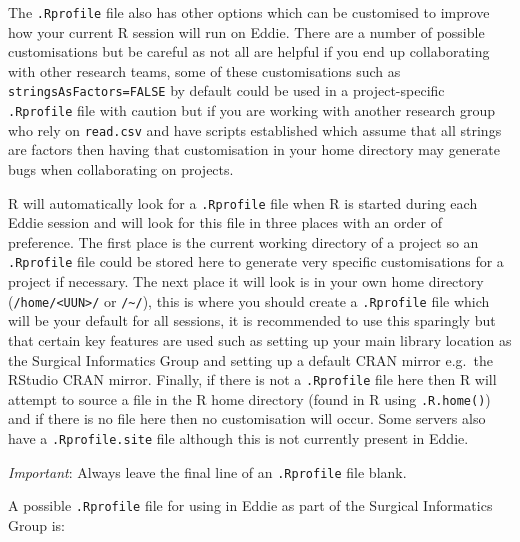 \documentclass[]{book}
\begin{document}
The \texttt{.Rprofile} file also has other options which can be customised to improve how your current R session will run on Eddie. There are a number of possible customisations but be careful as not all are helpful if you end up collaborating with other research teams, some of these customisations such as \texttt{stringsAsFactors=FALSE} by default could be used in a project-specific \texttt{.Rprofile} file with caution but if you are working with another research group who rely on \texttt{read.csv} and have scripts established which assume that all strings are factors then having that customisation in your home directory may generate bugs when collaborating on projects.

R will automatically look for a \texttt{.Rprofile} file when R is started during each Eddie session and will look for this file in three places with an order of preference. The first place is the current working directory of a project so an \texttt{.Rprofile} file could be stored here to generate very specific customisations for a project if necessary. The next place it will look is in your own home directory (\texttt{/home/\textless{}UUN\textgreater{}/} or \texttt{/\textasciitilde{}/}), this is where you should create a \texttt{.Rprofile} file which will be your default for all sessions, it is recommended to use this sparingly but that certain key features are used such as setting up your main library location as the Surgical Informatics Group and setting up a default CRAN mirror e.g.~the RStudio CRAN mirror. Finally, if there is not a \texttt{.Rprofile} file here then R will attempt to source a file in the R home directory (found in R using \texttt{.R.home()}) and if there is no file here then no customisation will occur. Some servers also have a \texttt{.Rprofile.site} file although this is not currently present in Eddie.

\emph{Important}: Always leave the final line of an \texttt{.Rprofile} file blank.

A possible \texttt{.Rprofile} file for using in Eddie as part of the Surgical Informatics Group is:
\end{document}
